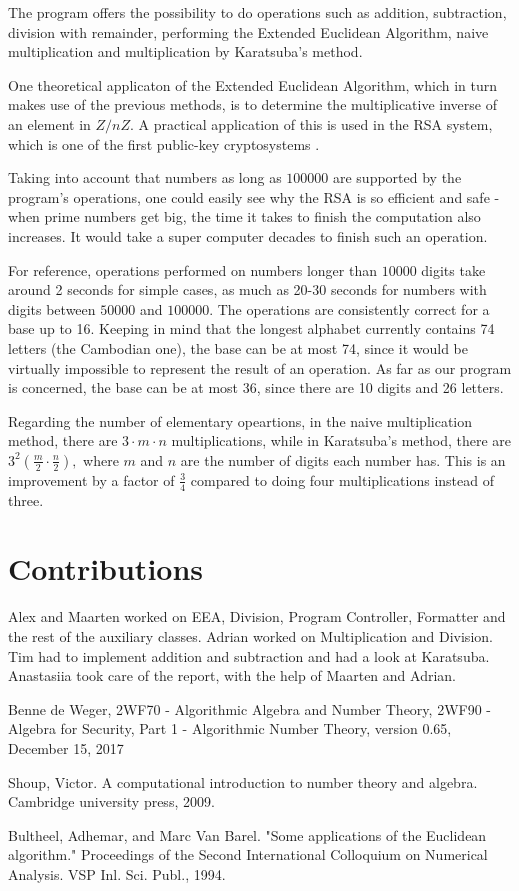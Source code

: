 \documentclass[a4paper]{article}
\begin{document}
The program offers the possibility to do operations such as addition, subtraction, division with remainder, performing the Extended Euclidean Algorithm, naive multiplication and multiplication by Karatsuba's method. 

One theoretical applicaton of the Extended Euclidean Algorithm, which in turn makes use of the previous methods, is to determine the multiplicative inverse of an element in $Z/nZ.$ A practical application of this is used in the RSA system, which is one of the first public-key cryptosystems \cite{someone}. 

Taking into account that numbers as long as $100 000$ are supported by the program's operations, one could easily see why the RSA is so efficient and safe - when prime numbers get big, the time it takes to finish the computation also increases. It would take a super computer decades to finish such an operation. 

For reference, operations performed on numbers longer than $10 000$ digits take around 2 seconds for simple cases, as much as 20-30 seconds for numbers with digits between $50 000$ and $100 000$. The operations are consistently correct for a base up to 16. Keeping in mind that the longest alphabet currently contains 74 letters (the Cambodian one), the base can be at most 74, since it would be virtually impossible to represent the result of an operation. As far as our program is concerned, the base can be at most 36, since there are 10 digits and 26 letters. 

Regarding the number of elementary opeartions, in the naive multiplication method, there are $ 3 \cdot m \cdot n$ multiplications, while in Karatsuba's method, there are $ 3^{2} (\frac{m}{2} \cdot \frac{n}{2}), $ where $m$ and $n$ are the number of digits each number has. This is an improvement by a factor of $\frac{3}{4}$ compared to doing four multiplications instead of three.


\section{Contributions}

Alex and Maarten worked on EEA, Division, Program Controller, Formatter and the rest of the auxiliary classes.
Adrian worked on Multiplication and Division.
Tim had to implement addition and subtraction and had a look at Karatsuba.
Anastasiia took care of the report, with the help of Maarten and Adrian.  

\begin{thebibliography}{9}

  Benne de Weger,
  2WF70 - Algorithmic Algebra and Number Theory,
  2WF90 - Algebra for Security,
  Part 1 - Algorithmic Number Theory,
  version 0.65,
  December 15, 2017

Shoup, Victor. A computational introduction to number theory and algebra. Cambridge university press, 2009.

Bultheel, Adhemar, and Marc Van Barel. "Some applications of the Euclidean algorithm." Proceedings of the Second International Colloquium on Numerical Analysis. VSP Inl. Sci. Publ., 1994.


\end{thebibliography}
\end{document}
